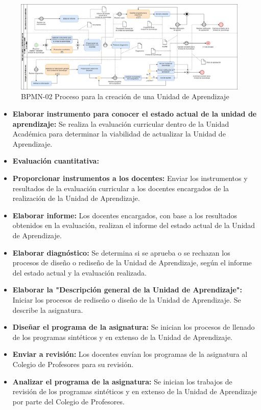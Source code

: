 \begin{figure}[htbp]
	\begin{center}
		\includegraphics[width=.80\textwidth]{C1-DP/SP1/IG-SP1/BPMN-02}
		\caption{BPMN-02 Proceso para la creación de una Unidad de Aprendizaje}
		\label{fig:BPMN-02}
	\end{center}
\end{figure}
\newpage
\begin{itemize}
	\item \textbf{Elaborar instrumento para conocer el estado actual de la unidad de aprendizaje:} Se realiza la evaluación curricular dentro de la Unidad Académica para determinar la viabilidad de actualizar la Unidad de Aprendizaje.
	\item \textbf{Evaluación cuantitativa:}
	\item \textbf{Proporcionar instrumentos a los docentes:} Enviar los instrumentos y resultados de la evaluación curricular a los docentes encargados de la realización de la Unidad de Aprendizaje.
	\item \textbf{Elaborar informe:} Los docentes encargados, con base a los resultados obtenidos en la evaluación, realizan el informe del estado actual de la Unidad de Aprendizaje.
	\item \textbf{Elaborar diagnóstico:} Se determina si se aprueba o se rechazan los procesos de diseño o rediseño de la Unidad de Aprendizaje, según el informe del estado actual y la evaluación realizada.
	\item \textbf{Elaborar la "Descripción general de la Unidad de Aprendizaje":} Iniciar los procesos de rediseño o diseño de la Unidad de Aprendizaje. Se describe la asignatura.
	
	\item \textbf{Diseñar el programa de la asignatura:} Se inician los procesos de llenado de los programas sintéticos y en extenso de la Unidad de Aprendizaje.
	\item \textbf{Enviar a revisión:}  Los docentes envían los programas de la asignatura al Colegio de Profesores para su revisión.
	\item \textbf{Analizar el programa de la asignatura:} Se inician los trabajos de revisión de los programas sintéticos y en extenso de la Unidad de Aprendizaje por parte del Colegio de Profesores.
	

\end{itemize}
